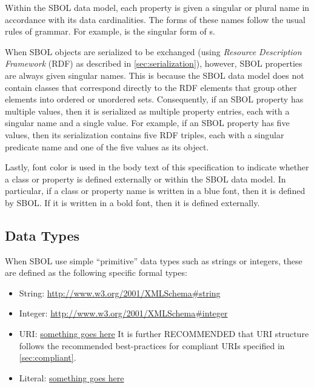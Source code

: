 Within the SBOL data model, each property is given a singular or plural name in accordance with its data cardinalities. The forms of these names follow the usual rules of grammar. For example,  is the singular form of s. 

When SBOL objects are serialized to be exchanged (using \emph{Resource Description Framework} (RDF) as described in \ref{sec:serialization}), however, SBOL properties are always given singular names. This is because the SBOL data model does not contain classes that correspond directly to the RDF elements that group other elements into ordered or unordered sets. Consequently, if an SBOL property has multiple values, then it is serialized as multiple property entries, each with a singular name and a single value.
For example, if an SBOL property has five values, then its serialization contains five RDF triples, each with a singular predicate name and one of the five values as its object.

Lastly, font color is used in the body text of this specification to indicate whether a class or property is defined externally or within the SBOL data model. In particular, if a class or property name is written in a blue font, then it is defined by SBOL. If it is written in a bold font, then it is defined externally.

\subsection{Data Types}
\label{sec:datatypes}


When SBOL use simple ``primitive'' data types such as strings or integers, these are defined as the following specific formal types:
\begin{itemize}
\item String: \url{http://www.w3.org/2001/XMLSchema#string}
\item Integer: \url{http://www.w3.org/2001/XMLSchema#integer}
\item URI: \url{something goes here}
  It is further RECOMMENDED that URI structure follows the recommended best-practices for compliant URIs specified in \ref{sec:compliant}.
\item Literal: \url{something goes here}
\end{itemize}

